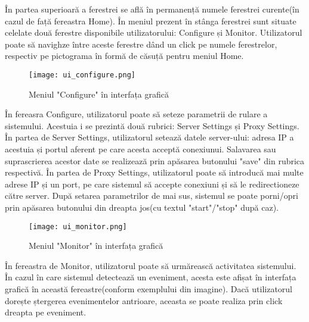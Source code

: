 În partea superioară a ferestrei se află în permanență numele ferestrei curente(în cazul de față fereastra Home). În meniul prezent în stânga ferestrei sunt situate celelate două ferestre disponibile utilizatorului: Configure și Monitor. Utilizatorul poate să navighze între aceste ferestre dând un click pe numele ferestrelor, respectiv pe pictograma în formă de căsuță pentru meniul Home.  \\

\begin{figure}[h]
	\centering
	\texttt{[image: ui\_configure.png]}
	\caption{ Meniul "Configure" în interfața grafică }
	\label{fig:ui_configure}
\end{figure}

În fereasra Configure, utilizatorul poate să seteze parametrii de rulare a sistemului. Acestuia i se prezintă două rubrici: Server Settings și Proxy Settings. În partea de Server Settings, utilizatorul setează datele server-ului: adresa IP a acestuia și portul aferent pe care acesta acceptă conexiunui. Salavarea sau suprascrierea acestor date se realizează prin apăsarea butonului "save" din rubrica respectivă. În partea de Proxy Settings, utilizatorul poate să introducă mai multe adrese IP și un port, pe care sistemul să accepte conexiuni și să le redirectioneze către server. După setarea parametrilor de mai sus, sistemul se poate porni/opri prin apăsarea butonului din dreapta jos(cu textul "start"/"stop" după caz). 
\newpage
\begin{figure}[h]
	\centering
	\texttt{[image: ui\_monitor.png]}
	\caption{ Meniul "Monitor" în interfața grafică }
	\label{fig:ui_monitor}
\end{figure}

În fereastra de Monitor, utilizatorul poate să urmărească activitatea sistemului. În cazul în care sistemul detectează un eveniment, acesta este afișat în interfața grafică în această fereastre(conform exemplului din imagine). Dacă utilizatorul dorește ștergerea evenimentelor antrioare, aceasta se poate realiza prin click dreapta pe eveniment. 